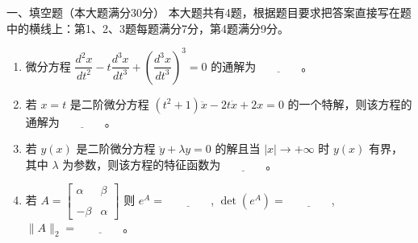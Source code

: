 一、填空题（本大题满分30分）
本大题共有4题，根据题目要求把答案直接写在题中的横线上：第1、2、3题每题满分7分，第4题满分9分。

\begin{enumerate}
    \item 微分方程 $\dfrac{d^2 x}{dt^2} - t \dfrac{d^3 x}{dt^3} + \left(\dfrac{d^3 x}{dt^3}\right)^3 = 0$ 的通解为$\underline{\qquad\qquad}$。
    
    \item 若 $x = t$ 是二阶微分方程 $(t^2 + 1) \ddot{x} - 2t \dot{x} + 2x = 0$ 的一个特解，则该方程的通解为$\underline{\qquad\qquad}$。
    
    \item 若 $y(x)$ 是二阶微分方程 $\ddot{y} + \lambda y = 0$ 的解且当 $|x| \to +\infty$ 时 $y(x)$ 有界，其中 $\lambda$ 为参数，则该方程的特征函数为$\underline{\qquad\qquad}$。
    
    \item 若 $A = \begin{bmatrix}
    \alpha & \beta \\ \\
    -\beta & \alpha
    \end{bmatrix}$ 则 $e^{A}=\underline{\qquad\qquad}$, $\det(e^{A})=\underline{\qquad\qquad}$, $\|A\|_2=\underline{\qquad\qquad}$。
\end{enumerate}

